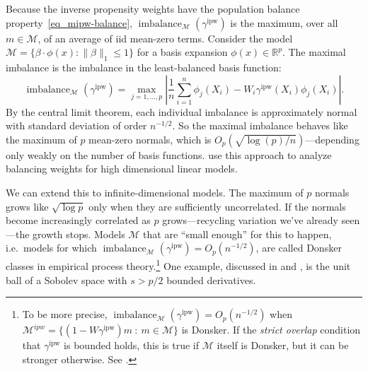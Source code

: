 \documentclass{article}
\theoremstyle{definition}
\newcommand{\R}{\ensuremath{\mathbb{R}}}
\newcommand{\ipw}{\text{ipw}}
\DeclareMathOperator{\imbalance}{imbalance}
\newcommand{\gammaipw}{\ensuremath{\gamma^{\ipw}}}
\newcommand{\model}{\mathcal{M}}
\newcommand{\<}{\langle}
\renewcommand{\>}{\rangle}
\begin{document}
Because the inverse propensity weights have the population balance property~\eqref{eq_mipw-balance},
$\imbalance_{\model}(\gammaipw)$ is the maximum, over all $m \in \model$, of an average of iid mean-zero terms. Consider the model $\model = \{\beta \cdot \phi(x) : \|\beta\|_1 \leq 1\}$ for a basis expansion $\phi(x) \in \R^p$. The maximal imbalance is the imbalance in the least-balanced basis function:
\begin{equation}
  \label{eq:ipw_linf_imbalance}
  \imbalance_\model(\gammaipw) = \max_{j=1,\ldots,p} \left| \frac{1}{n}\sum_{i=1}^n \phi_j(X_i) -  W_i \gammaipw(X_i) \phi_j(X_i)\right|.
\end{equation}
By the central limit theorem, each individual imbalance is approximately normal with standard deviation of order $n^{-1/2}$. So the maximal imbalance behaves like the maximum of $p$ mean-zero normals, which is $O_p(\sqrt{\log(p)/n})$---depending only weakly on the number of basis functions. \citet{athey2018approximate} use this approach to analyze balancing weights for high dimensional linear models.

We can extend this to infinite-dimensional models. The maximum of $p$ normals grows like $\sqrt{\log p}$ only when they are sufficiently uncorrelated. If the normals become increasingly correlated as $p$ grows---recycling variation we've already seen---the growth stops. Models $\model$ that are ``small enough'' for this to happen, i.e.\ models for which $\imbalance_\model(\gammaipw)=O_p(n^{-1/2})$, are called Donsker classes in empirical process theory.\footnote{To be more precise, $\imbalance_\model(\gammaipw)=O_p(n^{-1/2})$ when $\model^{ipw} = \{ (1-W\gammaipw)m \ : \ m \in \model \}$ is Donsker. If the \emph{strict overlap} condition that $\gammaipw$ is bounded holds, this is true if $\model$ itself is Donsker, but it can be stronger otherwise. See \citet[Remark 4]{hirshberg2021augmented}.} One example, discussed in \citet{kallus2020generalized} and \citet{wong2018kernel}, is the unit ball of a Sobolev space with $s > p/2$ bounded derivatives.
\end{document}
